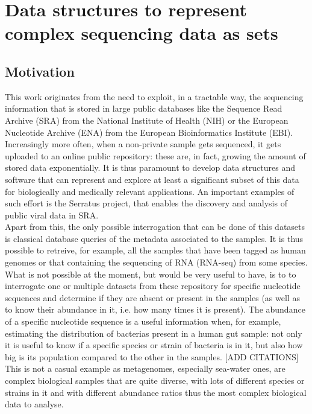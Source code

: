 \chapter{Data structures to represent complex sequencing data as \kmer sets}
\label{sec:cqf}

\section{Motivation}
This work originates from the need to exploit, in a tractable way, the sequencing information that is stored in large public databases like the Sequence Read Archive (SRA) from the National Institute of Health (NIH) or the European Nucleotide Archive (ENA) from the  European Bioinformatics Institute (EBI). Increasingly more often, when a non-private sample gets sequenced, it gets uploaded to an online public repository: these are, in fact, growing the amount of stored data exponentially. It is thus paramount to develop data structures and software that can represent and explore at least a significant subset of this data for biologically and medically relevant applications. An important examples of such effort is the Serratus project, that enables the discovery and analysis of public viral data in SRA. \cite{serratus}\\
Apart from this, the only possible interrogation that can be done of this datasets is classical database queries of the metadata associated to the samples. It is thus possible to retreive, for example, all the samples that have been tagged as human genomes or that containing the sequencing of RNA (RNA-seq) from some species. What is not possible at the moment, but would be very useful to have, is to to interrogate one or multiple datasets from these repository for specific nucleotide sequences and determine if they are absent or present in the samples (as well as to know their abundance in it, i.e. how many times it is present). 
The abundance of a specific nucleotide sequence is a useful information when, for example, estimating the distribution of bacterias present in a human gut sample: not only it is useful to know if a specific species or strain of bacteria is in it, but also how big is its population compared to the other in the samples. [ADD CITATIONS]\\
This is not a casual example as metagenomes, especially sea-water ones, are complex biological samples that are quite diverse, with lots of different species or strains in it and with different abundance ratios thus the most complex biological data to analyse. 
